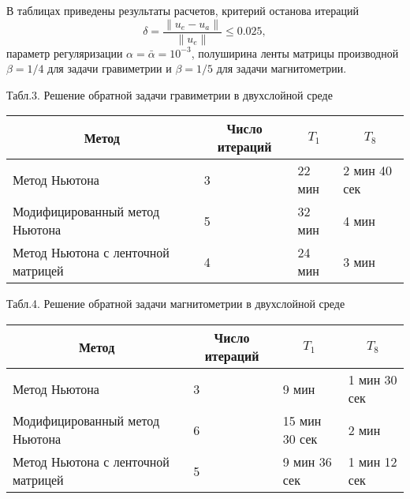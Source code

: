 \documentclass[10pt,pdf, mathserif, hyperref={unicode}]{beamer}
\begin{document}
\begin{frame}
	В таблицах приведены результаты расчетов, критерий останова итераций 
	$$\delta=\frac{\|u_e-u_a\|}{\|u_e\|}\le 0.025,$$ параметр регуляризации $\alpha=\bar{\alpha}=10^{-3}$, полуширина ленты матрицы производной $\beta=1/4$ для задачи гравиметрии и $\beta=1/5$ для задачи магнитометрии.
	\begin{table}[]
		\centering
		{\scriptsize Табл.3. Решение обратной задачи гравиметрии в двухслойной среде}
		\begin{tabular}{|p{}|l|l|l|}
			\hline
			\multicolumn{1}{|c|}{Метод}        & \multicolumn{1}{c|}{Число итераций} & \multicolumn{1}{c|}{$T_1$} & \multicolumn{1}{c|}{$T_8$} \\ \hline
			Метод Ньютона                      &  3                                  &       22 мин                  &     2 мин 40 сек                 \\ \hline
			Модифицированный метод Ньютона     &         5                           & 32 мин                  & 4 мин                   \\ \hline
			Метод Ньютона с ленточной матрицей &  4                                   & 24 мин                  & 3 мин                   \\ \hline
		\end{tabular}
	\end{table}
	\begin{table}[]
		\centering
		{\scriptsize Табл.4. Решение обратной задачи магнитометрии в двухслойной среде}
		\begin{tabular}{|p{}|p{}|l|l|}
			\hline
			\multicolumn{1}{|c|}{Метод}        & \multicolumn{1}{c|}{Число итераций} & \multicolumn{1}{c|}{$T_1$} & \multicolumn{1}{c|}{$T_8$} \\ \hline
			Метод Ньютона                      &   3                               &     9 мин                   &      1 мин 30 сек                 \\ \hline
			Модифицированный метод Ньютона     &              6                     & 15 мин 30 сек                & 2 мин                   \\ \hline
			Метод Ньютона с ленточной матрицей &   5                                  & 9 мин 36 сек                & 1 мин 12 сек                 \\ \hline
		\end{tabular}
	\end{table}
\end{frame}
\end{document}
